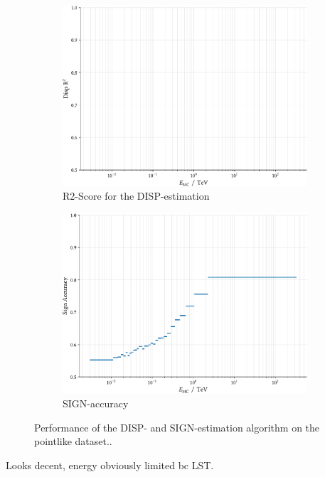 \begin{figure}
    \begin{subfigure}{0.45\textwidth}
        \includegraphics[width=0.9\linewidth]{../analysis/plots/disp_gamma_mono_lst_r2_equal_filled.pdf} 
        \caption{R2-Score for the DISP-estimation}
    \end{subfigure}
    \begin{subfigure}{0.45\textwidth}
        \includegraphics[width=0.9\linewidth]{../analysis/plots/disp_gamma_mono_lst_acc_equal_filled.pdf}
        \caption{SIGN-accuracy}
    \end{subfigure}
    \caption{Performance of the DISP- and SIGN-estimation algorithm on the pointlike dataset..}
    \label{fig:disp_gamma_perf}
\end{figure}

Looks decent, energy obviously limited bc LST.

\fi